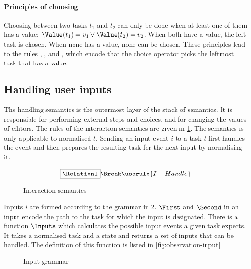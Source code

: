 \paragraph{Principles of choosing}
\label{sub:choosing-principles}

Choosing between two tasks $t_1$ and $t_2$ can only be done when
at least one of them has a value: $\Value(t_1) = v_1 \lor \Value(t_2) = v_2$.
When both have a value, the left task is chosen.
When none has a value, none can be chosen.
These principles lead to the rules , , and ,
which encode that the choice operator picks the leftmost task that has a value.



\subsection{Handling user inputs}
\label{sec:handling}

The handling semantics is the outermost layer of the stack of semantics.
It is responsible for performing external steps and choices, and for changing the values of editors.
The rules of the interaction semantics are given in \cref{fig:interaction-semantics}.
The semantics is only applicable to normalised $t$.
Sending an input event $i$ to a task $t$ first handles the event and then prepares the resulting task for the next input by normalising it.

\begin{figure}[h]
  \small
  \begin{gather*}
    \boxed{\RelationI} \Break
    \userule{I-Handle}
  \end{gather*}
  \caption{Interaction semantics} \label{fig:interaction-semantics}
\end{figure}

Inputs $i$ are formed according to the grammar in \cref{fig:input-grammar}.
$\First$ and $\Second$ in an input encode the path to the task for which the input is designated.
%
There is a function $\Inputs$ which calculates the possible input events a given task expects.
It takes a normalised task and a state and returns a set of inputs that can be handled.
The definition of this function is listed in \cref{fig:observation-input}.

\begin{figure}[h]
  \small
  \caption{Input grammar} \label{fig:input-grammar}
\end{figure}

